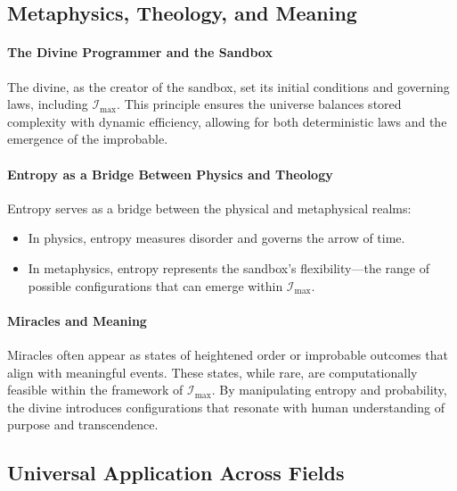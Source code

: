 \documentclass[12pt]{article}
\begin{document}
\subsection{Metaphysics, Theology, and Meaning}

\paragraph{The Divine Programmer and the Sandbox}
The divine, as the creator of the sandbox, set its initial conditions and governing laws, including \(\mathcal{I}_{\text{max}}\). This principle ensures the universe balances stored complexity with dynamic efficiency, allowing for both deterministic laws and the emergence of the improbable.

\paragraph{Entropy as a Bridge Between Physics and Theology}
Entropy serves as a bridge between the physical and metaphysical realms:
\begin{itemize}
    \item In physics, entropy measures disorder and governs the arrow of time.
    \item In metaphysics, entropy represents the sandbox's flexibility—the range of possible configurations that can emerge within \(\mathcal{I}_{\text{max}}\).
\end{itemize}

\paragraph{Miracles and Meaning}
Miracles often appear as states of heightened order or improbable outcomes that align with meaningful events. These states, while rare, are computationally feasible within the framework of \(\mathcal{I}_{\text{max}}\). By manipulating entropy and probability, the divine introduces configurations that resonate with human understanding of purpose and transcendence.

\subsection{Universal Application Across Fields}
\end{document}
